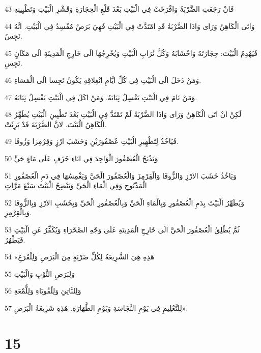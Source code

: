\par 43 فَانْ رَجَعَتِ الضَّرْبَةُ وَافْرَخَتْ فِي الْبَيْتِ بَعْدَ قَلْعِ الْحِجَارَةِ وَقَشْرِ الْبَيْتِ وَتَطْيِينِهِ
\par 44 وَاتَى الْكَاهِنُ وَرَاى وَاذَا الضَّرْبَةُ قَدِ امْتَدَّتْ فِي الْبَيْتِ فَهِيَ بَرَصٌ مُفْسِدٌ فِي الْبَيْتِ. انَّهُ نَجِسٌ.
\par 45 فَيَهْدِمُ الْبَيْتَ: حِجَارَتَهُ وَاخْشَابَهُ وَكُلَّ تُرَابِ الْبَيْتِ وَيُخْرِجُهَا الَى خَارِجِ الْمَدِينَةِ الَى مَكَانٍ نَجِسٍ.
\par 46 وَمَنْ دَخَلَ الَى الْبَيْتِ فِي كُلِّ ايَّامِ انْغِلاقِهِ يَكُونُ نَجِسا الَى الْمَسَاءِ.
\par 47 وَمَنْ نَامَ فِي الْبَيْتِ يَغْسِلُ ثِيَابَهُ. وَمَنْ اكَلَ فِي الْبَيْتِ يَغْسِلُ ثِيَابَهُ.
\par 48 لَكِنْ انْ اتَى الْكَاهِنُ وَرَاى وَاذَا الضَّرْبَةُ لَمْ تَمْتَدَّ فِي الْبَيْتِ بَعْدَ تَطْيِينِ الْبَيْتِ يُطَهِّرُ الْكَاهِنُ الْبَيْتَ. لانَّ الضَّرْبَةَ قَدْ بَرِئَتْ.
\par 49 فَيَاخُذُ لِتَطْهِيرِ الْبَيْتِ عُصْفُورَيْنِ وَخَشَبَ ارْزٍ وَقِرْمِزا وَزُوفَا.
\par 50 وَيَذْبَحُ الْعُصْفُورَ الْوَاحِدَ فِي انَاءِ خَزَفٍ عَلَى مَاءٍ حَيٍّ
\par 51 وَيَاخُذُ خَشَبَ الارْزِ وَالزُّوفَا وَالْقِرْمِزَ وَالْعُصْفُورَ الْحَيَّ وَيَغْمِسُهَا فِي دَمِ الْعُصْفُورِ الْمَذْبُوحِ وَفِي الْمَاءِ الْحَيِّ وَيَنْضِحُ الْبَيْتَ سَبْعَ مَرَّاتٍ
\par 52 وَيُطَهِّرُ الْبَيْتَ بِدَمِ الْعُصْفُورِ وَبِالْمَاءِ الْحَيِّ وَبِالْعُصْفُورِ الْحَيِّ وَبِخَشَبِ الارْزِ وَبِالزُّوفَا وَبِالْقِرْمِزِ.
\par 53 ثُمَّ يُطْلِقُ الْعُصْفُورَ الْحَيَّ الَى خَارِجِ الْمَدِينَةِ عَلَى وَجْهِ الصَّحْرَاءِ وَيُكَفِّرُ عَنِ الْبَيْتِ فَيَطْهُرُ.
\par 54 «هَذِهِ هِيَ الشَّرِيعَةُ لِكُلِّ ضَرْبَةٍ مِنَ الْبَرَصِ وَلِلْقَرَعِ
\par 55 وَلِبَرَصِ الثَّوْبِ وَالْبَيْتِ
\par 56 وَلِلنَّاتِئِ وَلِلْقُوبَاءِ وَلِلُّمْعَةِ
\par 57 لِلتَّعْلِيمِ فِي يَوْمِ النَّجَاسَةِ وَيَوْمِ الطَّهَارَةِ. هَذِهِ شَرِيعَةُ الْبَرَصِ».

\chapter{15}

